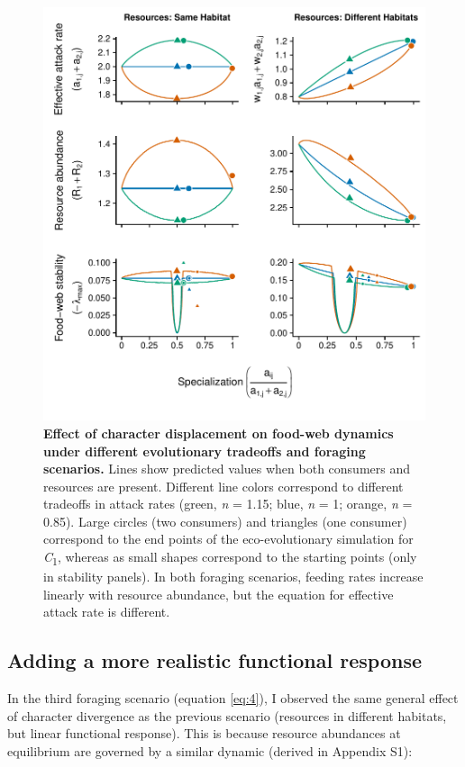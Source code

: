 \documentclass[11pt,]{article}
\begin{document}
\begin{figure}
\centering
\includegraphics{Fig_3_MacArthur_LawlorSmith.pdf}
\caption{\label{fig:plot_fig3}\textbf{Effect of character displacement
on food-web dynamics under different evolutionary tradeoffs and foraging
scenarios.} Lines show predicted values when both consumers and
resources are present. Different line colors correspond to different
tradeoffs in attack rates (green, \emph{n} = 1.15; blue, \emph{n} = 1;
orange, \emph{n} = 0.85). Large circles (two consumers) and triangles
(one consumer) correspond to the end points of the eco-evolutionary
simulation for \emph{C}\textsubscript{1}, whereas as small shapes
correspond to the starting points (only in stability panels). In both
foraging scenarios, feeding rates increase linearly with resource
abundance, but the equation for effective attack rate is different.}
\end{figure}

\subsection{Adding a more realistic functional
response}\label{adding-a-more-realistic-functional-response}

In the third foraging scenario (equation \ref{eq:4}), I observed the
same general effect of character divergence as the previous scenario
(resources in different habitats, but linear functional response). This
is because resource abundances at equilibrium are governed by a similar
dynamic (derived in Appendix S1):
\end{document}
